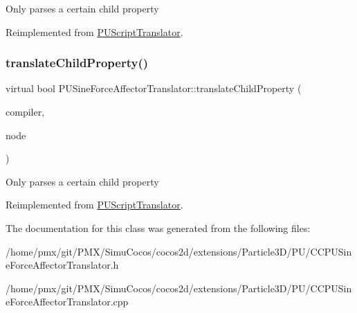 Only parses a certain child property 

Reimplemented from \hyperlink{classPUScriptTranslator_a0374d83a8a04e57918975d525e0f8fe8}{P\+U\+Script\+Translator}.

\mbox{\label{classPUSineForceAffectorTranslator_ac76a64f5950e4b3bdf60e62f4f89e645}} 
\subsubsection{\texorpdfstring{translate\+Child\+Property()}{translateChildProperty()}\hspace{0.1cm}{\footnotesize\ttfamily [2/2]}}
{\footnotesize\ttfamily virtual bool P\+U\+Sine\+Force\+Affector\+Translator\+::translate\+Child\+Property (\begin{DoxyParamCaption}\item[{\hyperlink{classPUScriptCompiler}{P\+U\+Script\+Compiler} $\ast$}]{compiler,  }\item[{\hyperlink{classPUAbstractNode}{P\+U\+Abstract\+Node} $\ast$}]{node }\end{DoxyParamCaption})\hspace{0.3cm}{\ttfamily [virtual]}}

Only parses a certain child property 

Reimplemented from \hyperlink{classPUScriptTranslator_a0374d83a8a04e57918975d525e0f8fe8}{P\+U\+Script\+Translator}.



The documentation for this class was generated from the following files\+:\begin{DoxyCompactItemize}
\item 
/home/pmx/git/\+P\+M\+X/\+Simu\+Cocos/cocos2d/extensions/\+Particle3\+D/\+P\+U/C\+C\+P\+U\+Sine\+Force\+Affector\+Translator.\+h\item 
/home/pmx/git/\+P\+M\+X/\+Simu\+Cocos/cocos2d/extensions/\+Particle3\+D/\+P\+U/C\+C\+P\+U\+Sine\+Force\+Affector\+Translator.\+cpp\end{DoxyCompactItemize}
